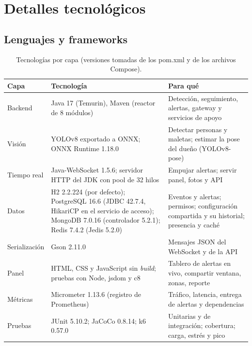 \chapter{Detalles tecnológicos}

\section{Lenguajes y frameworks}
\begin{table}[H]
\centering\small
\caption{Tecnologías por capa (versiones tomadas de los pom.xml y de los archivos Compose).}\label{tab:tec}
\begin{tabularx}{\textwidth}{lYY}
\toprule
\textbf{Capa} & \textbf{Tecnología} & \textbf{Para qué} \\
\midrule
Backend & Java 17 (Temurin), Maven (reactor de 8 módulos) & Detección, seguimiento, alertas, gateway y servicios de apoyo \\
Visión & YOLOv8 exportado a ONNX; ONNX Runtime 1.18.0 & Detectar personas y maletas; estimar la pose del dueño (YOLOv8-pose) \\
Tiempo real & Java-WebSocket 1.5.6; servidor HTTP del JDK con pool de 32 hilos & Empujar alertas; servir panel, fotos y API \\
Datos & H2 2.2.224 (por defecto); PostgreSQL 16.6 (JDBC 42.7.4, HikariCP en el servicio de acceso); MongoDB 7.0.16 (controlador 5.2.1); Redis 7.4.2 (Jedis 5.2.0) & Eventos y alertas; permisos; configuración compartida y su historial; presencia y caché \\
Serialización & Gson 2.11.0 & Mensajes JSON del WebSocket y de la API \\
Panel & HTML, CSS y JavaScript sin \emph{build}; pruebas con Node, jsdom y c8 & Tablero de alertas en vivo, compartir ventana, zonas, reporte \\
Métricas & Micrometer 1.13.6 (registro de Prometheus) & Tráfico, latencia, entrega de alertas y dependencias \\
Pruebas & JUnit 5.10.2; JaCoCo 0.8.14; k6 0.57.0 & Unitarias y de integración; cobertura; carga, estrés y pico \\
\bottomrule
\end{tabularx}
\end{table}

